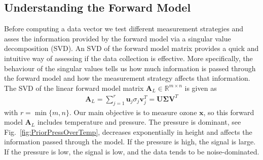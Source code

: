 \subsection{Understanding the Forward Model}
\label{sec:SVD}
Before computing a data vector we test different measurement strategies and asses the information provided by the forward model via a singular value decomposition (SVD).
An SVD of the forward model matrix provides a quick and intuitive way of assessing if the data collection is effective.
More specifically, the behaviour of the singular values tells us how much information is passed through the forward model and how the measurement strategy affects that information.
The SVD of the linear forward model matrix $\bm{A}_L \in \mathbb{R}^{m \times n}$ is given as
\begin{align}
	\bm{A}_L = \sum_{j =1}^{r} \bm{u}_j  \sigma_j \bm{v}^T_j = \bm{U} \bm{\Sigma} \bm{V}^T
\end{align}
with $r = \min\{m,n\}$.
Our main objective is to measure ozone $\bm{x}$, so this forward model $\bm{A}_L$ includes temperature and pressure.
The pressure is dominant, see Fig.~\ref{fig:PriorPressOverTemp}, decreases exponentially in height and affects the information passed through the model.
If the pressure is high, the signal is large.
If the pressure is low, the signal is low, and the data tends to be noise-dominated.

